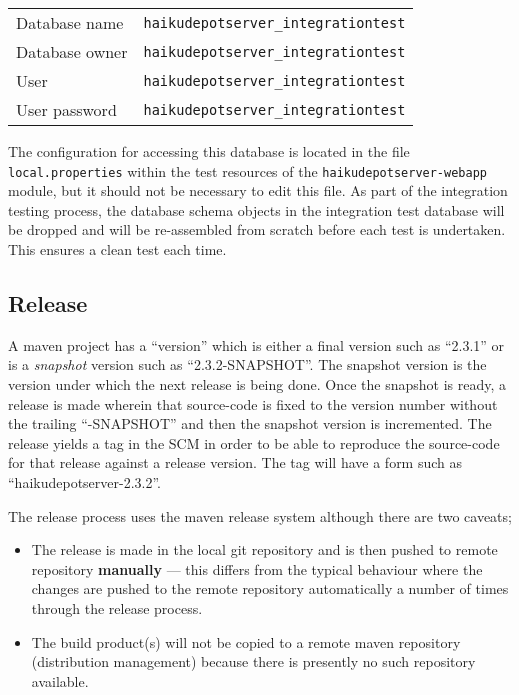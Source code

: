 \begin{tabular}{ | l | l | }
  \hline
  Database name & {\tt haikudepotserver\_integrationtest} \\
  Database owner & {\tt haikudepotserver\_integrationtest} \\
  User & {\tt haikudepotserver\_integrationtest} \\
  User password & {\tt haikudepotserver\_integrationtest} \\
  \hline
\end{tabular}

The configuration for accessing this database is located in the file {\tt local.properties} within the test resources of the {\tt haikudepotserver-webapp} module, but it should not be necessary to edit this file.  As part of the integration testing process, the database schema objects in the integration test database will be dropped and will be re-assembled from scratch before each test is undertaken.  This ensures a clean test each time.

\subsection{Release}

A maven project has a ``version'' which is either a final version such as ``2.3.1'' or is a {\it snapshot} version such as ``2.3.2-SNAPSHOT''.  The snapshot version is the version under which the next release is being done.  Once the snapshot is ready, a release is made wherein that source-code is fixed to the version number without the trailing ``-SNAPSHOT'' and then the snapshot version is incremented.  The release yields a tag in the SCM in order to be able to reproduce the source-code for that release against a release version.  The tag will have a form such as ``haikudepotserver-2.3.2''.

 The release process uses the maven release system although there are two caveats;

 \begin{itemize}
 \item The release is made in the local git repository and is then pushed to remote repository {\bf manually} --- this differs from the typical behaviour where the changes are pushed to the remote repository automatically a number of times through the release process.
 \item The build product(s) will not be copied to a remote maven repository (distribution management) because there is presently no such repository available.
 \end{itemize}

